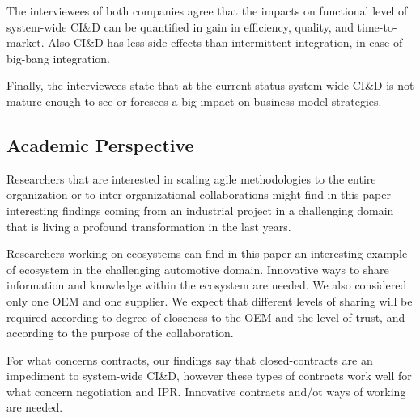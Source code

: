 The interviewees of both companies agree that the impacts on functional level of system-wide CI\&D %
can be quantified in gain in efficiency, quality, and time-to-market. Also CI\&D has less side effects than intermittent integration, in case of big-bang integration.  

Finally, the interviewees state that at the current status system-wide CI\&D is not mature enough to see or foresees a big impact on business model strategies. 

\subsection{Academic Perspective}

Researchers that are interested in scaling agile methodologies to the entire organization or to inter-organizational collaborations might find in this paper interesting findings coming from an industrial project in a challenging domain that is living a profound transformation in the last years. 

Researchers working on ecosystems can find in this paper an interesting example of ecosystem in the challenging automotive domain. Innovative ways to share information and knowledge within the ecosystem are needed. We also considered only one OEM and one supplier. We expect that different levels of sharing will be required according to degree of closeness to the OEM and the level of trust, and according to the purpose of the collaboration.

For what concerns contracts, our findings say that closed-contracts are an impediment to system-wide CI\&D, however these types of contracts work well for what concern negotiation and IPR. Innovative contracts and/ot ways of working are needed.

% 

